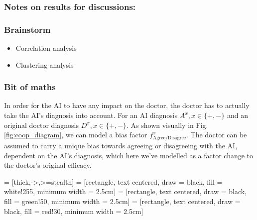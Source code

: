 \documentclass[manuscript,screen,review]{acmart}
\begin{document}
\subsubsection{Notes on results for discussions:}








\subsubsection{Brainstorm}
\begin{itemize}
    \item Correlation analysis
    \item Clustering analysis
\end{itemize}




\subsubsection{Bit of maths}

In order for the AI to have any impact on the doctor, the doctor has to actually take the AI's diagnosis into account. For an AI diagnosis $A^x, x\in \{+,- \}$ and an original doctor diagnosis $D^x, x\in \{+,- \}$. As shown visually in Fig. \ref{fig:coop_diagram}, we can model a bias factor $f^x_{\textrm{Agree/Disagree}}$. The doctor can be assumed to carry a unique bias towards agreeing or disagreeing with the AI, dependent on the AI's diagnosis, which here we've modelled as a factor change to the doctor's original efficacy.

 = [thick,->,>=stealth]
 = [rectangle, text centered, draw = black, fill = white!255, minimum width = 2.5cm]
 = [rectangle, text centered, draw = black, fill = green!50, minimum width = 2.5cm]
 = [rectangle, text centered, draw = black, fill = red!30, minimum width = 2.5cm]
\end{document}
